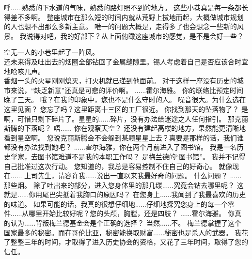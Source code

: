 \documentclass[openany]{book}
\begin{document}
\begin{dialogue}
     呼......熟悉的下水道的气味，熟悉的路灯照不到的地方。
     这些小巷真是每一条都长得差不多啊。
     整座城市在那么短的时间内就从荒野上拔地而起，大概做城市规划的人也想不出那么多新主意。
     唯一的问题大概是，走得多了也会想念一些新的风景。
     我说得对吧，我的好部下？从上面俯瞰这座城市的感觉，是不是会好一些？\par
    空无一人的小巷里起了一阵风。\\
    还未来得及吐出去的烟圈全部钻回了金属缝隙里。锡人考虑着自己是否应该合时宜地呛咳几声。\\
    香烟一头的火星刚刚熄灭，打火机就已递到他面前。
     对于这样一座没有历史的城市来说，“缺乏新意”还真是可悲的评价啊。
     ......霍尔海雅。
     你的联络比预定时间晚了三天。
     哦？在我的印象中，您也不是什么守时的人。
     噪音很大。为什么选在这里见面？
     您忘了吗？这里距离十三区的工厂很近。
     你找到那天的坠落物了？
     是啊，可惜只剩下碎片了。星星的......碎片，没有办法给迷途之人任何指引。
     那克丽斯腾的下落呢？
     唔......
     你在观察天空？
     还没有建起高楼的地方，果然能更清晰地看到星空啊。
     您说克丽斯腾会不会躲到某颗星星上去？真要是那样的话，我们谁都没有办法找到她吧？
     ......霍尔海雅，你在两个月前进入了图书馆。
     我是一名历史学家，去图书馆难道不是我的本职工作吗？
     是梅兰德的“图书馆”。
     我并不记得自己批准过这次行动。
     您知道的，我总是容易控制不住自己的好奇心。
     就像现在......
     上司先生，请容许我......说出一直以来我最好奇的问题。
     什么问题？
     ......那些烟。
     除了吐出来的部分，进入您身体里的那几缕......究竟会钻去哪里呢？
     这就是......你用尾巴尖抵着我胸口的原因吗？
     在您身上......我闻到了我最喜欢的历史的味道。
     如果可能的话，我真的很想仔细地......仔细地探究您身上的每一个零件......从哪里开始比较好呢？您的头颅，胸膛，还是四肢？
     ......霍尔海雅。
     你真的认为......背叛梅兰德基金会是个正确的选择？
     当然......不。
     梅兰德掌握了这个国家最多的秘密。而在哥伦比亚，秘密能换取财富......秘密也是杀人的武器。
     我花了整整三年的时间，才取得了进入历史协会的资格，又花了三年时间，取得了您的信任。

\end{dialogue}
\end{document}
